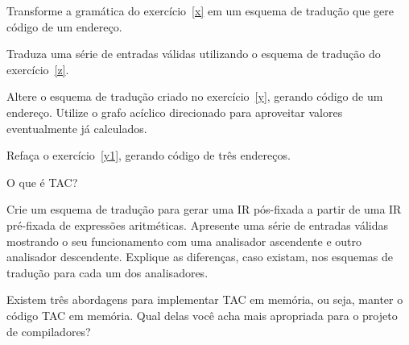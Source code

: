 \documentclass{compiladores}
\begin{document}
\begin{listanumerada}
\item \label{z} Transforme a gramática do exercício~\ref{x} em um esquema de
  tradução que gere código de um endereço.

\item Traduza uma série de entradas válidas utilizando o esquema de
  tradução do exercício~\ref{z}.

\item \label{y1} Altere o esquema de tradução criado no exercício~\ref{y},
  gerando código de um endereço. Utilize o grafo acíclico direcionado
  para aproveitar valores eventualmente já calculados.

\item Refaça o exercício~\ref{y1}, gerando código de três endereços.

\item O que é TAC?

\item Crie um esquema de tradução para gerar uma IR pós-fixada a
  partir de uma IR pré-fixada de expressões aritméticas. Apresente uma
  série de entradas válidas mostrando o seu funcionamento com uma
  analisador ascendente e outro analisador descendente. Explique as
  diferenças, caso existam, nos esquemas de tradução para cada um dos
  analisadores.

\item Existem três abordagens para implementar TAC em memória, ou
  seja, manter o código TAC em memória. Qual delas você acha mais
  apropriada para o projeto de compiladores?
\end{listanumerada}
\end{document}
